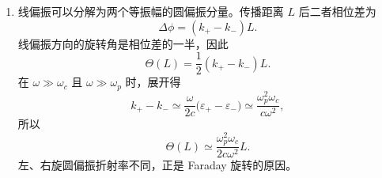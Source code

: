 \begin{question}
\begin{solution}
\begin{enumerate}
  \item 线偏振可以分解为两个等振幅的圆偏振分量。传播距离 $L$ 后二者相位差为
  \[
    \Delta\phi=(k_+-k_-)L .
  \]
  线偏振方向的旋转角是相位差的一半，因此
  \[
    \boxed{\Theta(L)=\frac12(k_+-k_-)L} .
  \]
  在 $\omega\gg\omega_c$ 且 $\omega\gg\omega_p$ 时，展开得
  \[
    k_+-k_-\simeq \frac{\omega}{2c}\bigl(\varepsilon_+-\varepsilon_-\bigr)
    \simeq \frac{\omega_p^2\omega_c}{c\omega^2},
  \]
  所以
  \[
    \Theta(L)\simeq \frac{\omega_p^2\omega_c}{2c\omega^2}L .
  \]
  左、右旋圆偏振折射率不同，正是 Faraday 旋转的原因。
\end{enumerate}
\end{solution}
\end{question}
